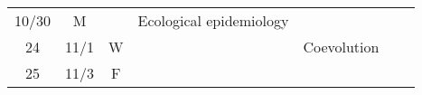 \documentclass[]{article}
\begin{document}
\begin{longtable}[]{@{}cccllll@{}}
\begin{minipage}[t]{0.08\columnwidth}
10/30\strut
\end{minipage} & \begin{minipage}[t]{0.07\columnwidth}\centering\strut
M\strut
\end{minipage} & \begin{minipage}[t]{0.10\columnwidth}\raggedright\strut
\strut
\end{minipage} & \begin{minipage}[t]{0.11\columnwidth}\raggedright\strut
Ecological epidemiology\strut
\end{minipage} & \begin{minipage}[t]{0.11\columnwidth}\raggedright\strut
\strut
\end{minipage} & \begin{minipage}[t]{0.16\columnwidth}\raggedright\strut
\strut
\end{minipage}\tabularnewline
\begin{minipage}[t]{0.12\columnwidth}\centering\strut
24\strut
\end{minipage} & \begin{minipage}[t]{0.08\columnwidth}\centering\strut
11/1\strut
\end{minipage} & \begin{minipage}[t]{0.07\columnwidth}\centering\strut
W\strut
\end{minipage} & \begin{minipage}[t]{0.10\columnwidth}\raggedright\strut
\strut
\end{minipage} & \begin{minipage}[t]{0.11\columnwidth}\raggedright\strut
Coevolution\strut
\end{minipage} & \begin{minipage}[t]{0.11\columnwidth}\raggedright\strut
\strut
\end{minipage} & \begin{minipage}[t]{0.16\columnwidth}\raggedright\strut
\strut
\end{minipage}\tabularnewline
\begin{minipage}[t]{0.12\columnwidth}\centering\strut
25\strut
\end{minipage} & \begin{minipage}[t]{0.08\columnwidth}\centering\strut
11/3\strut
\end{minipage} & \begin{minipage}[t]{0.07\columnwidth}\centering\strut
F\strut
\end{minipage} & \begin{minipage}[t]{0.10\columnwidth}\raggedright\strut

\end{minipage}
\end{longtable}
\end{document}
